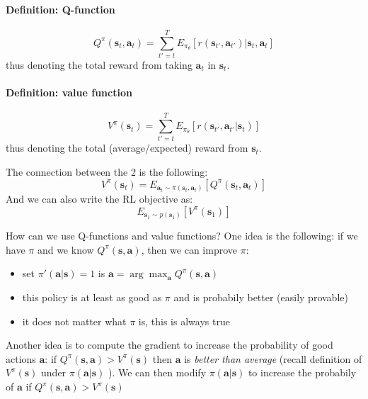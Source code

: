 \documentclass{report}
\newcommand{\argmax}{\arg\!\max}
\begin{document}
\paragraph{Definition: Q-function}
\begin{equation}
		Q^\pi (\bm{s}_t, \bm{a}_t) = \sum_{t'=t}^{T} E_{\pi_\theta}
		\left[ r(\bm{s}_{t'}, \bm{a}_{t'} )| \bm{s}_t, \bm{a}_t \right] 
\end{equation}
thus denoting the total reward from taking $\bm{a}_t$ in $\bm{s}_t$.

\paragraph{Definition: value function}
\begin{equation}
		V^\pi (\bm{s}_t) = \sum_{t'=t}^{T} E_{\pi_\theta}
		\left[ r(\bm{s}_{t'}, \bm{a}_{t'} | \bm{s}_t) \right] 
\end{equation}
thus denoting the total (average/expected) reward from $\bm{s}_t$.

The connection between the 2 is the following:
\begin{equation}
		V^\pi (\bm{s}_t) = E_{\bm{a}_t \sim \pi(\bm{s}_t, \bm{a}_t)}
		\left[ Q^\pi(\bm{s}_t, \bm{a}_t) \right] 
\end{equation}
And we can also write the RL objective as:
\begin{equation}
		E_{\bm{s}_1 \sim p(\bm{s}_1)}
		\left[ V^\pi (\bm{s}_1) \right] 
\end{equation}

How can we use Q-functions and value functions?
One idea is the following: if we have $\pi$ and we know $Q^\pi(\bm{s}, \bm{a})$,
then we can improve $\pi$:
\begin{itemize}
		\item set $\pi'(\bm{a}|\bm{s}) = 1$ is $\bm{a} = \argmax_{\bm{a}} Q^\pi(\bm{s}, \bm{a})$
		\item this policy is at least as good as $\pi$ and is probabily better (easily provable)
		\item it does not matter what $\pi$ is, this is always true
\end{itemize}

Another idea is to compute the gradient to increase the probability of good actions $\bm{a}$:
if $ Q^\pi(\bm{s}, \bm{a}) > V^\pi(\bm{s})$ then $\bm{a}$ is \textit{better than average} (recall definition of $V^\pi(\bm{s})$ under $\pi(\bm{a}|\bm{s}) $  ).
We can then modify $\pi(\bm{a}|\bm{s})$ to increase the probabily of $\bm{a}$ if $ Q^\pi(\bm{s}, \bm{a}) > V^\pi(\bm{s})$
\end{document}
